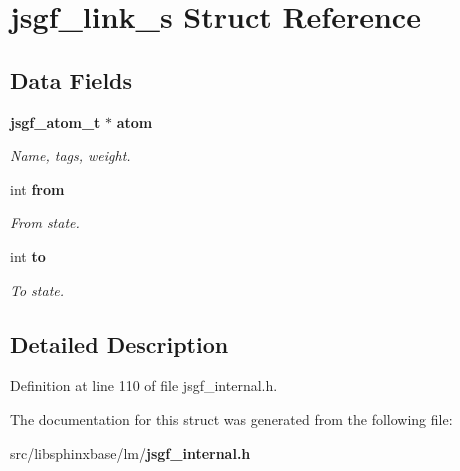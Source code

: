 \section{jsgf\-\_\-link\-\_\-s Struct Reference}
\label{structjsgf__link__s}
\subsection*{Data Fields}
\begin{DoxyCompactItemize}
\item 
{\bf jsgf\-\_\-atom\-\_\-t} $\ast$ {\bf atom}\label{structjsgf__link__s_a140a7cfbe76100928b9c7ea052435ca5}

\begin{DoxyCompactList}\small\item\em Name, tags, weight. \end{DoxyCompactList}\item 
int {\bf from}\label{structjsgf__link__s_a02f9b2bc3b98e802164e80d051923bb3}

\begin{DoxyCompactList}\small\item\em From state. \end{DoxyCompactList}\item 
int {\bf to}\label{structjsgf__link__s_a9da8ad9d87149f0cfca6ca815c581717}

\begin{DoxyCompactList}\small\item\em To state. \end{DoxyCompactList}\end{DoxyCompactItemize}


\subsection{Detailed Description}


Definition at line 110 of file jsgf\-\_\-internal.\-h.



The documentation for this struct was generated from the following file\-:\begin{DoxyCompactItemize}
\item 
src/libsphinxbase/lm/{\bf jsgf\-\_\-internal.\-h}\end{DoxyCompactItemize}
